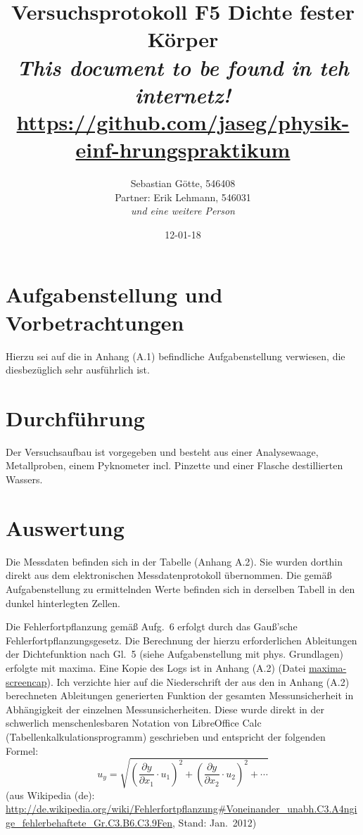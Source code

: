 \documentclass[12pt,a4paper,notitlepage]{article}
\title{Versuchsprotokoll F5 Dichte fester Körper\\
\small\emph{This document to be found in teh internetz!}\\
\url{https://github.com/jaseg/physik-einf-hrungspraktikum}}
\author{Sebastian Götte, 546408\\
Partner: Erik Lehmann, 546031\\
\emph{und eine weitere Person}}
\date{12-01-18}
\begin{document}
\maketitle
\section{Aufgabenstellung und Vorbetrachtungen}
Hierzu sei auf die in Anhang (A.1) befindliche Aufgabenstellung verwiesen, die diesbezüglich sehr ausführlich ist.
\section{Durchführung}
Der Versuchsaufbau ist vorgegeben und besteht aus einer Analysewaage, Metallproben, einem Pyknometer incl. Pinzette und einer Flasche destillierten Wassers.
\section{Auswertung}
Die Messdaten befinden sich in der Tabelle (Anhang A.2). Sie wurden dorthin direkt aus dem elektronischen Messdatenprotokoll übernommen. Die gemäß Aufgabenstellung zu ermittelnden Werte befinden sich in derselben Tabell in den dunkel hinterlegten Zellen.

Die Fehlerfortpflanzung gemäß Aufg.\ 6 erfolgt durch das Gauß'sche Fehlerfortpflanzungsgesetz. Die Berechnung der hierzu erforderlichen Ableitungen der Dichtefunktion nach Gl.\ 5 (siehe Aufgabenstellung mit phys. Grundlagen) erfolgte mit maxima. Eine Kopie des Logs ist in Anhang (A.2) (Datei \url{maxima-screencap}).
Ich verzichte hier auf die Niederschrift der aus den in Anhang (A.2) berechneten Ableitungen generierten Funktion der gesamten Messunsicherheit in Abhängigkeit der einzelnen Messunsicherheiten. Diese wurde direkt in der schwerlich menschenlesbaren Notation von LibreOffice Calc (Tabellenkalkulationsprogramm) geschrieben und entspricht der folgenden Formel:
\begin{equation}
{u_y}=\sqrt {\left (\frac{\partial y}{\partial x_1} \cdot u_1 \right)^2 +\left (\frac{\partial y}{\partial x_2} \cdot u_2 \right)^2 +\cdots }
\end{equation}
(aus Wikipedia (de): \url{http://de.wikipedia.org/wiki/Fehlerfortpflanzung#Voneinander_unabh.C3.A4ngige_fehlerbehaftete_Gr.C3.B6.C3.9Fen}, Stand: Jan.\ 2012)
\end{document}
